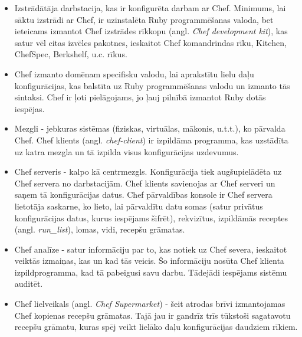 \begin{itemize}
	\item Izstrādātāja darbstacija, kas ir konfigurēta darbam ar Chef. Minimums, lai sāktu izstrādi ar Chef, ir uzinstalēta Ruby programmēšanas valoda, bet ieteicams izmantot Chef izstrādes rīkkopu (angl. \textit{Chef development kit}), kas satur vēl citas izvēles pakotnes, ieskaitot Chef komandrindas rīku, Kitchen, ChefSpec, Berkshelf, u.c. rīkus.
	\item Chef izmanto domēnam specifisku valodu, lai aprakstītu lielu daļu konfigurācijas, kas balstīta uz Ruby programmēšanas valodu un izmanto tās sintaksi. Chef ir ļoti pielāgojams, jo ļauj pilnībā izmantot Ruby dotās iespējas.
	\item Mezgli - jebkuras sistēmas (fiziskas, virtuālas, mākonis, u.t.t.), ko pārvalda Chef. Chef klients (angl. \textit{chef-client}) ir izpildāma programma, kas uzstādīta uz katra mezgla un tā izpilda visus konfigurācijas uzdevumus.
	\item Chef serveris - kalpo kā centrmezgls. Konfigurācija tiek augšupielādēta uz Chef servera no darbstacijām. Chef klients savienojas ar Chef serveri un saņem tā konfigurācijas datus.
	Chef pārvaldības konsole ir Chef servera lietotāja saskarne, ko lieto, lai pārvaldītu datu somas (satur privātus konfigurācijas datus, kurus iespējams šifrēt), rekvizītus, izpildāmās receptes (angl. \textit{run_list}), lomas, vidi, recepšu grāmatas.
	\item Chef analīze - satur informāciju par to, kas notiek uz Chef severa, ieskaitot veiktās izmaiņas, kas un kad tās veicis. Šo informāciju nosūta Chef klienta izpildprogramma, kad tā pabeigusi savu darbu. Tādejādi iespējams sistēmu auditēt.
	\item Chef lielveikals (angl. \textit{Chef Supermarket}) - šeit atrodas brīvi izmantojamas Chef kopienas recepšu grāmatas. Tajā jau ir gandrīz trīs tūkstoši sagatavotu recepšu grāmatu, kuras spēj veikt lielāko daļu konfigurācijas daudziem rīkiem.
\end{itemize}



